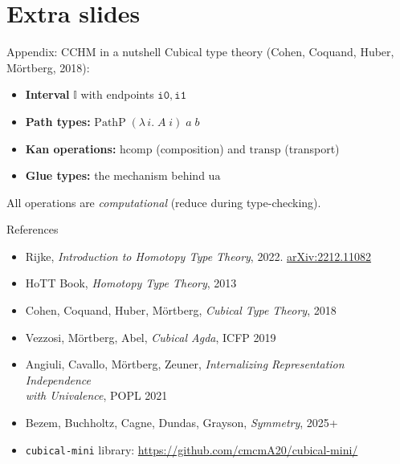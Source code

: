 \documentclass[aspectratio=169,12pt]{beamer}
\newcommand{\ua}{\mathrm{ua}}
\begin{document}
\appendix
\section*{Extra slides}

\begin{frame}{Appendix: CCHM in a nutshell}
  Cubical type theory (Cohen, Coquand, Huber, M\"{o}rtberg, 2018):
  \medskip
  \begin{itemize}
    \item \textbf{Interval} $\mathbb{I}$ with endpoints $\mathtt{i0}, \mathtt{i1}$
    \item \textbf{Path types:} $\mathrm{PathP}\;(\lambda\,i.\;A\;i)\;a\;b$
    \item \textbf{Kan operations:} $\mathrm{hcomp}$ (composition)
          and $\mathrm{transp}$ (transport)
    \item \textbf{Glue types:} the mechanism behind $\ua$
  \end{itemize}
  \medskip
  All operations are \emph{computational} (reduce during type-checking).
\end{frame}

\begin{frame}{References}
  \small
  \begin{itemize}
    \item Rijke, \emph{Introduction to Homotopy Type Theory}, 2022.
          \href{https://arxiv.org/abs/2212.11082}{arXiv:2212.11082}
    \item HoTT Book, \emph{Homotopy Type Theory}, 2013
    \item Cohen, Coquand, Huber, M\"{o}rtberg,
          \emph{Cubical Type Theory}, 2018
    \item Vezzosi, M\"{o}rtberg, Abel,
          \emph{Cubical Agda}, ICFP 2019
    \item Angiuli, Cavallo, M\"{o}rtberg, Zeuner,
          \emph{Internalizing Representation Independence \\
          with Univalence}, POPL 2021
    \item Bezem, Buchholtz, Cagne, Dundas, Grayson,
          \emph{Symmetry}, 2025+
    \item \texttt{cubical-mini} library:
          \url{https://github.com/cmcmA20/cubical-mini/}
  \end{itemize}
\end{frame}
\end{document}
